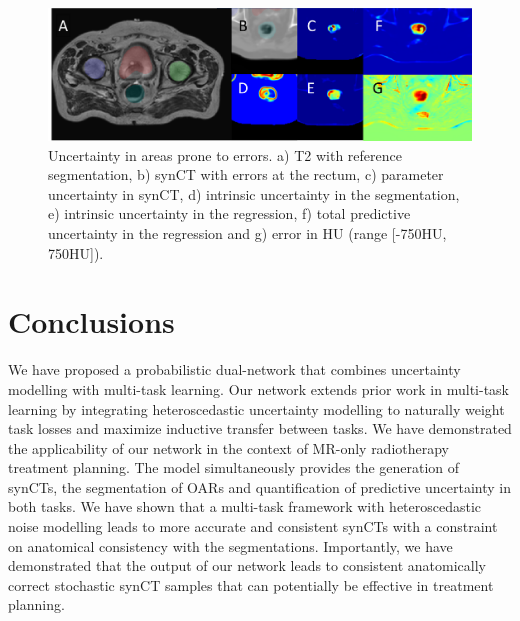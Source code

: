 \begin{figure}[!t]
	\centering
	\includegraphics[width=\linewidth]{chapter_5/figures/figure_unc_2.pdf}
	\caption{Uncertainty in areas prone to errors. a) T2 with reference segmentation, b) synCT with errors at the rectum, c) parameter uncertainty in synCT, d) intrinsic uncertainty in the segmentation, e) intrinsic uncertainty in the regression, f) total predictive uncertainty in the regression and g) error in HU (range [-750HU, 750HU]).} 
	\label{fig:diagram4}
\end{figure}

\section{Conclusions}

We have proposed a probabilistic dual-network that combines uncertainty modelling with multi-task learning. Our network extends prior work in multi-task learning by integrating heteroscedastic uncertainty modelling to naturally weight task losses and maximize inductive transfer between tasks. We have demonstrated the applicability of our network in the context of MR-only radiotherapy treatment planning.  The model simultaneously provides the generation of synCTs, the segmentation of OARs and quantification of predictive uncertainty in both tasks. We have shown that a multi-task framework with heteroscedastic noise modelling leads to more accurate and consistent synCTs with a constraint on anatomical consistency with the segmentations. Importantly, we have demonstrated that the output of our network leads to consistent anatomically correct stochastic synCT samples that can potentially be effective in treatment planning. 





